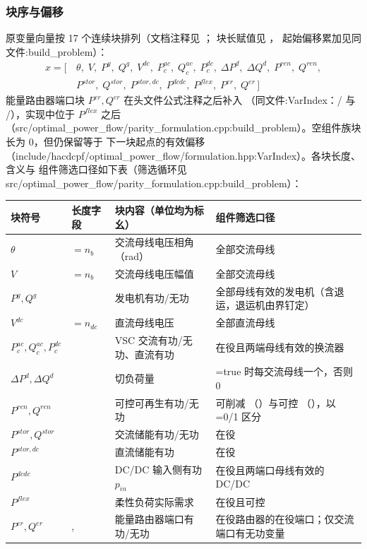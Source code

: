 \subsubsection*{块序与偏移}
原变量向量按 17 个连续块排列（文档注释见
；
块长赋值见 ，
起始偏移累加见同文件:build\_problem）：
\begin{align*}
x = [\,&\theta,\; V,\; P^g,\; Q^g,\; V^{dc},\; P^{ac}_c,\; Q^{ac}_c,\; P^{dc}_c,\;
\Delta P^d,\; \Delta Q^d,\; P^{ren},\; Q^{ren},\\
&P^{stor},\; Q^{stor},\; P^{stor,dc},\; P^{dcdc},\; P^{flex},\; P^{er},\; Q^{er}\,]
\end{align*}
能量路由器端口块 $P^{er},Q^{er}$ 在头文件公式注释之后补入
（同文件:VarIndex：/ 与
/），实现中位于 $P^{flex}$ 之后
（src/optimal\_power\_flow/parity\_formulation.cpp:build\_problem）。空组件族块长为 0，但仍保留等于
下一块起点的有效偏移（include/hacdcpf/optimal\_power\_flow/formulation.hpp:VarIndex）。各块长度、含义与
组件筛选口径如下表（筛选循环见 src/optimal\_power\_flow/parity\_formulation.cpp:build\_problem）：

\begin{center}
\footnotesize
\begin{tabular}{@{}l l L{4.6cm} L{6.2cm}@{}}
\toprule
块符号 & 长度字段 & 块内容（单位均为标幺） & 组件筛选口径\\
\midrule
$\theta$ & $=n_b$ & 交流母线电压相角（rad） & 全部交流母线\\
$V$ & $=n_b$ & 交流母线电压幅值 & 全部交流母线\\
$P^g,Q^g$ &  & 发电机有功/无功 & 全部母线有效的发电机（含退运，退运机由界钉定）\\
$V^{dc}$ & $=n_{dc}$ & 直流母线电压 & 全部直流母线\\
$P^{ac}_c,Q^{ac}_c,P^{dc}_c$ &  & VSC 交流有功/无功、直流有功 & 在役且两端母线有效的换流器\\
$\Delta P^d,\Delta Q^d$ &  & 切负荷量 & =true 时每交流母线一个，否则 0\\
$P^{ren},Q^{ren}$ &  & 可控可再生有功/无功 & 可削减 （）与可控 （），以 =0/1 区分\\
$P^{stor},Q^{stor}$ &  & 交流储能有功/无功 & 在役 \\
$P^{stor,dc}$ &  & 直流储能有功 & 在役 \\
$P^{dcdc}$ &  & DC/DC 输入侧有功 $p_{in}$ & 在役且两端口母线有效的 DC/DC\\
$P^{flex}$ &  & 柔性负荷实际需求 & 在役且可控 \\
$P^{er},Q^{er}$ & , & 能量路由器端口有功/无功 & 在役路由器的在役端口；仅交流端口有无功变量\\
\bottomrule
\end{tabular}
\end{center}

